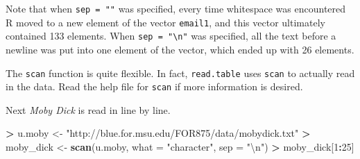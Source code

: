 \documentclass[]{krantz}
\makeatletter
\newenvironment{Shaded}{\begin{snugshade}}{\end{snugshade}}
\newcommand{\CharTok}[1]{\textcolor[rgb]{0.5,0.5,0.5}{#1}}
\newcommand{\DataTypeTok}[1]{\textcolor[rgb]{0.27,0.27,0.27}{#1}}
\newcommand{\DecValTok}[1]{\textcolor[rgb]{0.06,0.06,0.06}{#1}}
\newcommand{\KeywordTok}[1]{\textcolor[rgb]{0.27,0.27,0.27}{\textbf{#1}}}
\newcommand{\NormalTok}[1]{#1}
\newcommand{\OperatorTok}[1]{\textcolor[rgb]{0.43,0.43,0.43}{\textbf{#1}}}
\newcommand{\StringTok}[1]{\textcolor[rgb]{0.5,0.5,0.5}{#1}}
\newenvironment{kframe}{%
\medskip{}
\setlength{\fboxsep}{.8em}
 \def\at@end@of@kframe{}%
 \ifinner\ifhmode%
  \def\at@end@of@kframe{\end{minipage}}%
  \begin{minipage}{\columnwidth}%
 \fi\fi%
 \def\FrameCommand##1{\hskip\@totalleftmargin \hskip-\fboxsep
 \colorbox{shadecolor}{##1}\hskip-\fboxsep
     \hskip-\linewidth \hskip-\@totalleftmargin \hskip\columnwidth}%
 \MakeFramed {\advance\hsize-\width
   \@totalleftmargin\z@ \linewidth\hsize
   \@setminipage}}%
 {\par\unskip\endMakeFramed%
 \at@end@of@kframe}
\renewenvironment{Shaded}{\begin{kframe}}{\end{kframe}}
\makeatother
\begin{document}
Note that when \texttt{sep\ =\ ""} was specified, every time whitespace was encountered R moved to a new element of the vector \texttt{email1}, and this vector ultimately contained 133 elements. When \texttt{sep\ =\ "\textbackslash{}n"} was specified, all the text before a newline was put into one element of the vector, which ended up with 26 elements.

The \texttt{scan} function is quite flexible. In fact, \texttt{read.table} uses \texttt{scan} to actually read in the data. Read the help file for \texttt{scan} if more information is desired.

Next \emph{Moby Dick} is read in line by line.

\begin{Shaded}
\begin{Highlighting}[]
\OperatorTok{>}\StringTok{ }\NormalTok{u.moby <-}\StringTok{ "http://blue.for.msu.edu/FOR875/data/mobydick.txt"}
\OperatorTok{>}\StringTok{ }\NormalTok{moby_dick <-}\StringTok{ }\KeywordTok{scan}\NormalTok{(u.moby, }\DataTypeTok{what =} \StringTok{"character"}\NormalTok{, }\DataTypeTok{sep =} \StringTok{"}\CharTok{\textbackslash{}n}\StringTok{"}\NormalTok{)}
\OperatorTok{>}\StringTok{ }\NormalTok{moby_dick[}\DecValTok{1}\OperatorTok{:}\DecValTok{25}\NormalTok{]}
\end{Highlighting}
\end{Shaded}
\end{document}

